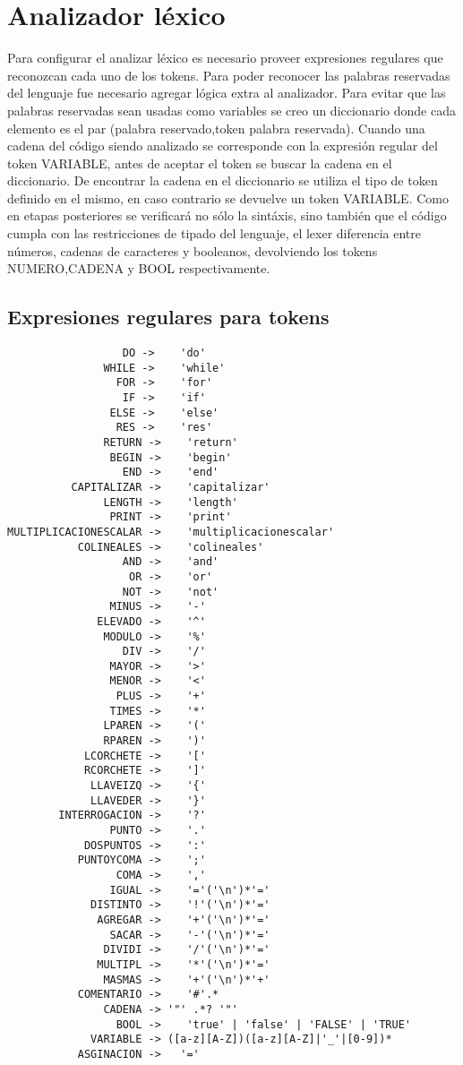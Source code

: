 \section{Analizador léxico }

Para configurar el analizar léxico es necesario proveer expresiones regulares que reconozcan cada uno de los tokens. Para poder reconocer las palabras reservadas del lenguaje  fue necesario agregar lógica extra al analizador. Para evitar que las palabras reservadas sean usadas como variables se creo un diccionario donde cada elemento es el par (palabra reservado,token palabra reservada). Cuando una cadena del código siendo analizado se corresponde con la expresión regular del token VARIABLE, antes de aceptar el token se buscar la cadena en el diccionario. De encontrar la cadena en el diccionario se utiliza el tipo de token definido en el mismo, en caso contrario se devuelve un token VARIABLE. 
Como en etapas posteriores se verificará no sólo la sintáxis, sino también que el código cumpla con las restricciones de tipado del lenguaje, el lexer diferencia entre números, cadenas de caracteres y booleanos, devolviendo los tokens NUMERO,CADENA y BOOL respectivamente.

\subsection{Expresiones regulares para tokens}

\begin{verbatim}
                  DO ->    'do'
               WHILE ->    'while'
                 FOR ->    'for'
                  IF ->    'if'
                ELSE ->    'else'
                 RES ->    'res'
               RETURN ->    'return'
                BEGIN ->    'begin'
                  END ->    'end'
          CAPITALIZAR ->    'capitalizar'
               LENGTH ->    'length'
                PRINT ->    'print'
MULTIPLICACIONESCALAR ->    'multiplicacionescalar'
           COLINEALES ->    'colineales'
                  AND ->    'and'
                   OR ->    'or'
                  NOT ->    'not'
                MINUS ->    '-'
              ELEVADO ->    '^'
               MODULO ->    '%'
                  DIV ->    '/'
                MAYOR ->    '>'
                MENOR ->    '<'
                 PLUS ->    '+'
                TIMES ->    '*'
               LPAREN ->    '('
               RPAREN ->    ')'
            LCORCHETE ->    '['
            RCORCHETE ->    ']'
             LLAVEIZQ ->    '{'
             LLAVEDER ->    '}'
        INTERROGACION ->    '?'
                PUNTO ->    '.'
            DOSPUNTOS ->    ':'
           PUNTOYCOMA ->    ';'
                 COMA ->    ','
                IGUAL ->    '='('\n')*'='
             DISTINTO ->    '!'('\n')*'='
              AGREGAR ->    '+'('\n')*'='
                SACAR ->    '-'('\n')*'='
               DIVIDI ->    '/'('\n')*'='
              MULTIPL ->    '*'('\n')*'='
               MASMAS ->    '+'('\n')*'+'
           COMENTARIO ->    '#'.*
               CADENA -> '"' .*? '"'
                 BOOL ->    'true' | 'false' | 'FALSE' | 'TRUE'
             VARIABLE -> ([a-z][A-Z])([a-z][A-Z]|'_'|[0-9])*
           ASGINACION ->   '='

\end{verbatim}
